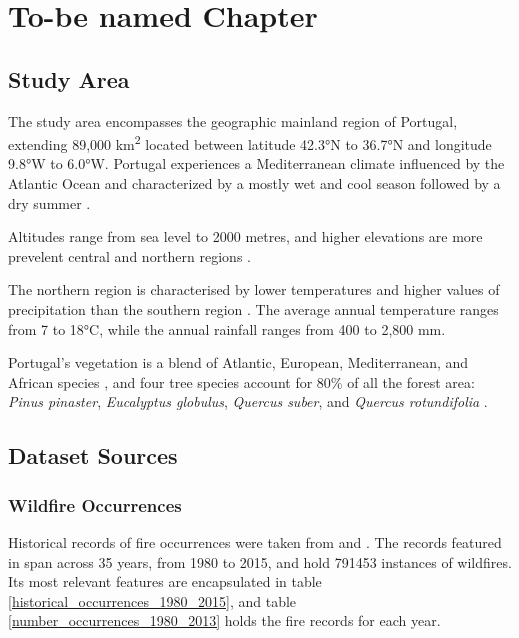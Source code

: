 \chapter{To-be named Chapter}
\label{sec:implementation}

\section{Study Area}
The study area encompasses the geographic mainland region of Portugal, extending 89,000 km\textsuperscript{2} located between latitude 42.3°N to 36.7°N and longitude 9.8°W to 6.0°W. Portugal experiences a Mediterranean climate influenced by the Atlantic Ocean and characterized by a mostly wet and cool season followed by a dry summer \cite{Mora2020, portugalClimate01, Marques2011}.

Altitudes range from sea level to  2000 metres, and higher elevations are more prevelent central and northern regions \cite{Marques2011}.

The northern region is characterised by lower temperatures and higher values of precipitation than the southern region \cite{Marques2011}. The average annual temperature ranges from 7 to 18°C, while the annual rainfall ranges from 400 to 2,800 mm.

Portugal's vegetation is a blend of Atlantic, European, Mediterranean, and African species \cite{britannica_portugal_climate}, and four tree species account for 80\% of all the forest area: \textit{Pinus pinaster}, \textit{Eucalyptus globulus}, \textit{Quercus suber}, and \textit{Quercus rotundifolia} \cite{Marques2011}.





\section{Dataset Sources}

\subsection{Wildfire Occurrences}
Historical records of fire occurrences were taken from \cite{centraldedados_incendios_website, centraldedados_incendios} and \cite{icnf2024}. The records featured in \cite{centraldedados_incendios_website, centraldedados_incendios} span across 35 years, from 1980 to 2015, and hold 791453 instances of wildfires. Its most relevant features are encapsulated in table \ref{historical_occurrences_1980_2015}, and table \ref{number_occurrences_1980_2013} holds the fire records for each year.


